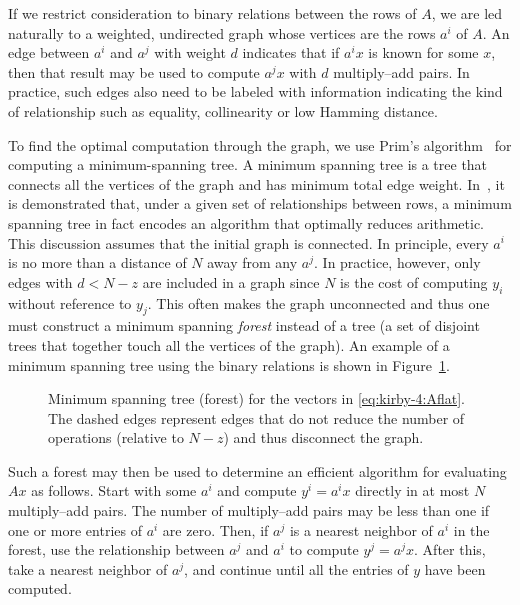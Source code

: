 If we restrict consideration to binary relations between the rows of $
A $, we are led naturally to a weighted, undirected graph whose
vertices are the rows $ a^i $ of $A$.  An edge between $ a^i $ and $
a^j $ with weight $ d $ indicates that if $ a^i x $ is known for some
$ x $, then that result may be used to compute $ a^j x $ with $ d $
multiply--add pairs.  In practice, such edges also need to be labeled
with information indicating the kind of relationship such as equality,
collinearity or low Hamming distance.

To find the optimal computation through the graph, we use Prim's
algorithm~\cite{Prim1957} for computing a minimum-spanning tree. A
minimum spanning tree is a tree that connects all the vertices of the
graph and has minimum total edge
weight. In~\cite{KirbyLoggScottEtAl2006}, it is demonstrated that,
under a given set of relationships between rows, a minimum spanning
tree in fact encodes an algorithm that optimally reduces arithmetic.
This discussion assumes that the initial graph is connected. In
principle, every $ a^i $ is no more than a distance of $ N $ away from
any $ a^j $. In practice, however, only edges with $d < N - z$ are
included in a graph since $N$ is the cost of computing $ y_i $ without
reference to $ y_j $. This often makes the graph unconnected and thus
one must construct a minimum spanning \emph{forest} instead of a tree
(a set of disjoint trees that together touch all the vertices of the
graph). An example of a minimum spanning tree using the binary
relations is shown in Figure~\ref{fig:kirby-4:mst}.

\begin{figure}
  \begin{center}
  \def\svgwidth{\columnwidth} %
   
    \caption{Minimum spanning tree (forest) for the vectors in
      \eqref{eq:kirby-4:Aflat}. The dashed edges represent edges that
      do not reduce the number of operations (relative to $N - z$) and
      thus disconnect the graph.}
    \label{fig:kirby-4:mst}
  \end{center}
\end{figure}

Such a forest may then be used to determine an efficient algorithm for
evaluating $ A x $ as follows. Start with some $ a^i $ and
compute $ y^i = a^i x $ directly in at most $ N $ multiply--add
pairs. The number of multiply--add pairs may be less than one if one
or more entries of $a^i$ are zero. Then, if $ a^j $ is a nearest
neighbor of $ a^i $ in the forest, use the relationship between $
a^j $ and $ a^i $ to compute $ y^j = a^j x $.  After this, take a
nearest neighbor of $ a^j $, and continue until all the entries of
$ y $ have been computed.


